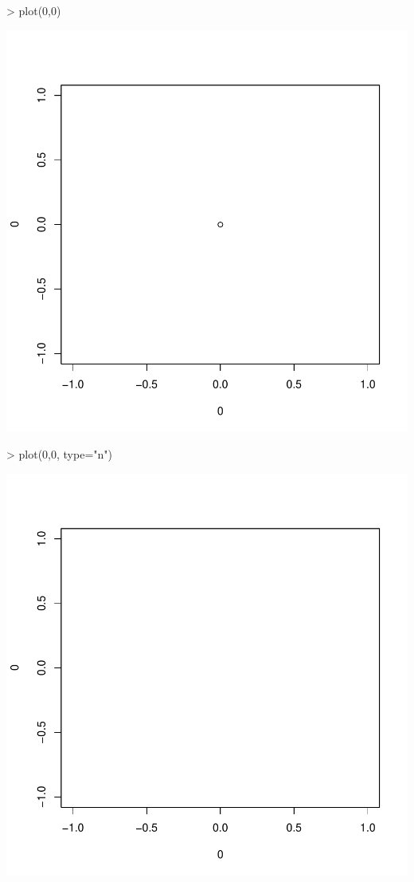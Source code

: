 \documentclass[12pt]{article}
\begin{document}
\begin{Schunk}
\begin{Sinput}
> plot(0,0)
\end{Sinput}
\end{Schunk}
\includegraphics{ensayo-013}
\begin{Schunk}
\begin{Sinput}
> plot(0,0, type="n")
\end{Sinput}
\end{Schunk}
\includegraphics{ensayo-014}
\end{document}
